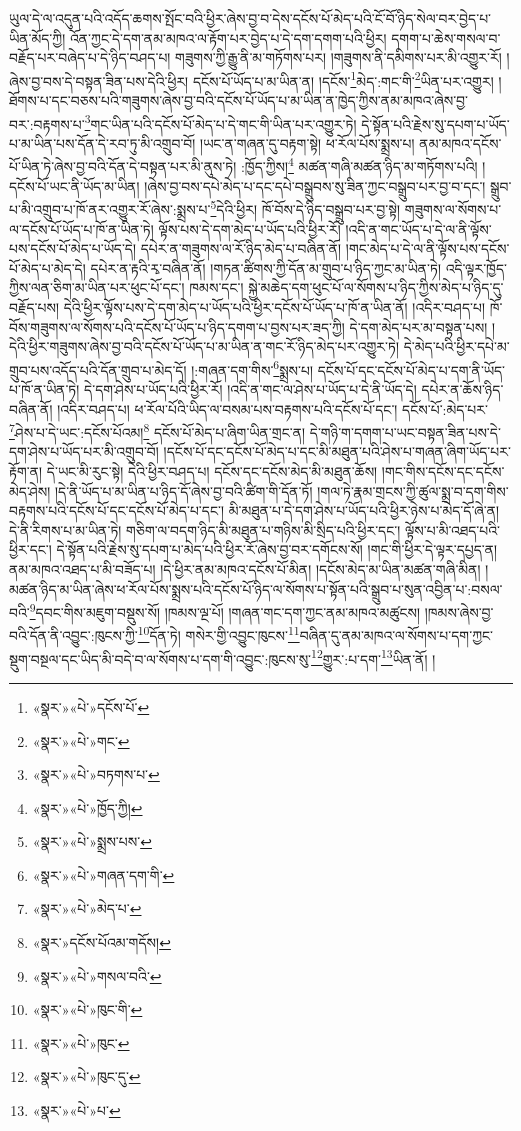 ཡུལ་དེ་ལ་འདུན་པའི་འདོད་ཆགས་སྤོང་བའི་ཕྱིར་ཞེས་བྱ་བ་དེས་དངོས་པོ་མེད་པའི་ངོ་བོ་ཉིད་སེལ་བར་བྱེད་པ་ཡིན་མོད་ཀྱི། འོན་ཀྱང་དེ་དག་ནམ་མཁའ་ལ་རྟོག་པར་བྱེད་པ་དེ་དག་དགག་པའི་ཕྱིར། དགག་པ་ཆེས་གསལ་བ་བརྗོད་པར་བཞེད་པ་དེ་ཉིད་བཤད་པ། གཟུགས་ཀྱི་རྒྱུ་ནི་མ་གཏོགས་པར། །གཟུགས་ནི་དམིགས་པར་མི་འགྱུར་རོ། །ཞེས་བྱ་བས་དེ་བསྟན་ཟིན་པས་དེའི་ཕྱིར། དངོས་པོ་ཡོད་པ་མ་ཡིན་ན། །དངོས་\footnote{«སྣར་»«པེ་»དངོས་པོ་}མེད་:གང་གི་\footnote{«སྣར་»«པེ་»གང་}ཡིན་པར་འགྱུར། །ཐོགས་པ་དང་བཅས་པའི་གཟུགས་ཞེས་བྱ་བའི་དངོས་པོ་ཡོད་པ་མ་ཡིན་ན་ཁྱེད་ཀྱིས་ནམ་མཁའ་ཞེས་བྱ་བར་:བརྟགས་པ་\footnote{«སྣར་»«པེ་»བཏགས་པ་}གང་ཡིན་པའི་དངོས་པོ་མེད་པ་དེ་གང་གི་ཡིན་པར་འགྱུར་ཏེ། དེ་སྟོན་པའི་རྗེས་སུ་དཔག་པ་ཡོད་པ་མ་ཡིན་པས་དོན་དེ་རབ་ཏུ་མི་འགྲུབ་བོ། །ཡང་ན་གཞན་དུ་བརྟག་སྟེ། ཕ་རོལ་པོས་སྨྲས་པ། ནམ་མཁའ་དངོས་པོ་ཡིན་ཏེ་ཞེས་བྱ་བའི་དོན་དེ་བསྟན་པར་མི་ནུས་ཏེ། :ཁྱོད་ཀྱིས།\footnote{«སྣར་»«པེ་»ཁྱོད་ཀྱི།} མཚན་གཞི་མཚན་ཉིད་མ་གཏོགས་པའི། །དངོས་པོ་ཡང་ནི་ཡོད་མ་ཡིན། །ཞེས་བྱ་བས་དཔེ་མེད་པ་དང་དཔེ་བསྒྲུབས་སུ་ཟིན་ཀྱང་བསྒྲུབ་པར་བྱ་བ་དང་། སྒྲུབ་པ་མི་འགྲུབ་པ་ཁོ་ནར་འགྱུར་རོ་ཞེས་:སྨྲས་པ་\footnote{«སྣར་»«པེ་»སྨྲས་པས་}དེའི་ཕྱིར། ཁོ་བོས་དེ་ཉིད་བསྒྲུབ་པར་བྱ་སྟེ། གཟུགས་ལ་སོགས་པ་ལ་དངོས་པོ་ཡོད་པ་ཁོ་ན་ཡིན་ཏེ། ལྟོས་པས་དེ་དག་མེད་པ་ཡོད་པའི་ཕྱིར་རོ། །འདི་ན་གང་ཡོད་པ་དེ་ལ་ནི་ལྟོས་པས་དངོས་པོ་མེད་པ་ཡོད་དེ། དཔེར་ན་གཟུགས་ལ་རོ་ཉིད་མེད་པ་བཞིན་ནོ། །གང་མེད་པ་དེ་ལ་ནི་ལྟོས་པས་དངོས་པོ་མེད་པ་མེད་དེ། དཔེར་ན་རྟའི་རྭ་བཞིན་ནོ། །གཏན་ཚིགས་ཀྱི་དོན་མ་གྲུབ་པ་ཉིད་ཀྱང་མ་ཡིན་ཏེ། འདི་ལྟར་ཁྱོད་ཀྱིས་ལན་ཅིག་མ་ཡིན་པར་ཕུང་པོ་དང་། ཁམས་དང་། སྐྱེ་མཆེད་དག་ཕུང་པོ་ལ་སོགས་པ་ཉིད་ཀྱིས་མེད་པ་ཉིད་དུ་བརྗོད་པས། དེའི་ཕྱིར་ལྟོས་པས་དེ་དག་མེད་པ་ཡོད་པའི་ཕྱིར་དངོས་པོ་ཡོད་པ་ཁོ་ན་ཡིན་ནོ། །འདིར་བཤད་པ། ཁོ་བོས་གཟུགས་ལ་སོགས་པའི་དངོས་པོ་ཡོད་པ་ཉིད་དགག་པ་བྱས་པར་ཟད་ཀྱི། དེ་དག་མེད་པར་མ་བསྟན་པས། །དེའི་ཕྱིར་གཟུགས་ཞེས་བྱ་བའི་དངོས་པོ་ཡོད་པ་མ་ཡིན་ན་གང་རོ་ཉིད་མེད་པར་འགྱུར་ཏེ། དེ་མེད་པའི་ཕྱིར་དཔེ་མ་གྲུབ་པས་འདོད་པའི་དོན་གྲུབ་པ་མེད་དོ། །:གཞན་དག་གིས་\footnote{«སྣར་»«པེ་»གཞན་དག་གི་}སྨྲས་པ། དངོས་པོ་དང་དངོས་པོ་མེད་པ་དག་ནི་ཡོད་པ་ཁོ་ན་ཡིན་ཏེ། དེ་དག་ཤེས་པ་ཡོད་པའི་ཕྱིར་རོ། །འདི་ན་གང་ལ་ཤེས་པ་ཡོད་པ་དེ་ནི་ཡོད་དེ། དཔེར་ན་ཆོས་ཉིད་བཞིན་ནོ། །འདིར་བཤད་པ། ཕ་རོལ་པོའི་ཡིད་ལ་བསམ་པས་བརྟགས་པའི་དངོས་པོ་དང་། དངོས་པོ་:མེད་པར་\footnote{«སྣར་»«པེ་»མེད་པ་}ཤེས་པ་དེ་ཡང་:དངོས་པོའམ།\footnote{«སྣར་»དངོས་པོའམ་གདོས།} དངོས་པོ་མེད་པ་ཞིག་ཡིན་གྲང་ན། དེ་གཉི་ག་དགག་པ་ཡང་བསྟན་ཟིན་པས་དེ་དག་ཤེས་པ་ཡོད་པར་མི་འགྲུབ་བོ། །དངོས་པོ་དང་དངོས་པོ་མེད་པ་དང་མི་མཐུན་པའི་ཤེས་པ་གཞན་ཞིག་ཡོད་པར་རྟོག་ན། དེ་ཡང་མི་རུང་སྟེ། དེའི་ཕྱིར་བཤད་པ། དངོས་དང་དངོས་མེད་མི་མཐུན་ཆོས། །གང་གིས་དངོས་དང་དངོས་མེད་ཤེས། །དེ་ནི་ཡོད་པ་མ་ཡིན་པ་ཉིད་དོ་ཞེས་བྱ་བའི་ཚིག་གི་དོན་ཏོ། །གལ་ཏེ་རྣམ་གྲངས་ཀྱི་ཚུལ་སྨྲ་བ་དག་གིས་བརྟགས་པའི་དངོས་པོ་དང་དངོས་པོ་མེད་པ་དང་། མི་མཐུན་པ་དེ་དག་ཤེས་པ་ཡོད་པའི་ཕྱིར་ཉེས་པ་མེད་དོ་ཞེ་ན། དེ་ནི་རིགས་པ་མ་ཡིན་ཏེ། གཅིག་ལ་བདག་ཉིད་མི་མཐུན་པ་གཉིས་མི་སྲིད་པའི་ཕྱིར་དང་། ལྟོས་པ་མི་འཐད་པའི་ཕྱིར་དང་། དེ་སྟོན་པའི་རྗེས་སུ་དཔག་པ་མེད་པའི་ཕྱིར་རོ་ཞེས་བྱ་བར་དགོངས་སོ། །གང་གི་ཕྱིར་དེ་ལྟར་དཔྱད་ན། ནམ་མཁའ་འཐད་པ་མི་བཟོད་པ། །དེ་ཕྱིར་ནམ་མཁའ་དངོས་པོ་མིན། །དངོས་མེད་མ་ཡིན་མཚན་གཞི་མིན། །མཚན་ཉིད་མ་ཡིན་ཞེས་ཕ་རོལ་པོས་སྨྲས་པའི་དངོས་པོ་ཉིད་ལ་སོགས་པ་སྟོན་པའི་སྒྲུབ་པ་སུན་འབྱིན་པ་:བསལ་བའི་\footnote{«སྣར་»«པེ་»གསལ་བའི་}དབང་གིས་མཇུག་བསྡུས་སོ། །ཁམས་ལྔ་པོ། །གཞན་གང་དག་ཀྱང་ནམ་མཁའ་མཚུངས། །ཁམས་ཞེས་བྱ་བའི་དོན་ནི་འབྱུང་:ཁུངས་ཀྱི་\footnote{«སྣར་»«པེ་»ཁུང་གི་}དོན་ཏེ། གསེར་གྱི་འབྱུང་ཁུངས་\footnote{«སྣར་»«པེ་»ཁུང་}བཞིན་དུ་ནམ་མཁའ་ལ་སོགས་པ་དག་ཀྱང་སྡུག་བསྔལ་དང་ཡིད་མི་བདེ་བ་ལ་སོགས་པ་དག་གི་འབྱུང་:ཁུངས་སུ་\footnote{«སྣར་»«པེ་»ཁུང་དུ་}གྱུར་:པ་དག་\footnote{«སྣར་»«པེ་»པ་}ཡིན་ནོ། །

